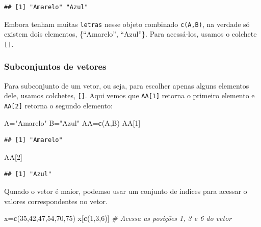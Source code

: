 \documentclass[
]{book}
\newenvironment{Shaded}{\begin{snugshade}}{\end{snugshade}}
\newcommand{\CommentTok}[1]{\textcolor[rgb]{0.56,0.35,0.01}{\textit{#1}}}
\newcommand{\DecValTok}[1]{\textcolor[rgb]{0.00,0.00,0.81}{#1}}
\newcommand{\KeywordTok}[1]{\textcolor[rgb]{0.13,0.29,0.53}{\textbf{#1}}}
\newcommand{\NormalTok}[1]{#1}
\newcommand{\StringTok}[1]{\textcolor[rgb]{0.31,0.60,0.02}{#1}}
\theoremstyle{definition}
\theoremstyle{definition}
\theoremstyle{definition}
\theoremstyle{remark}
\begin{document}
\begin{verbatim}
## [1] "Amarelo" "Azul"
\end{verbatim}

Embora tenham muitas \texttt{letras} nesse objeto combinado \texttt{c(A,B)}, na verdade só existem dois elementos, \{``Amarelo'', ``Azul''\}. Para acessá-los, usamos o colchete \texttt{{[}{]}}.

\hypertarget{subconjuntos-de-vetores}{%
\subsubsection{Subconjuntos de vetores}\label{subconjuntos-de-vetores}}

Para subconjunto de um vetor, ou seja, para escolher apenas alguns elementos dele, usamos colchetes, \texttt{{[}{]}}. Aqui vemos que \texttt{AA{[}1{]}} retorna o primeiro elemento e \texttt{AA{[}2{]}} retorna o segundo elemento:

\begin{Shaded}
\begin{Highlighting}[]
\NormalTok{A=}\StringTok{"Amarelo"}
\NormalTok{B=}\StringTok{"Azul"}
\NormalTok{AA=}\KeywordTok{c}\NormalTok{(A,B)}
\NormalTok{AA[}\DecValTok{1}\NormalTok{]}
\end{Highlighting}
\end{Shaded}

\begin{verbatim}
## [1] "Amarelo"
\end{verbatim}

\begin{Shaded}
\begin{Highlighting}[]
\NormalTok{AA[}\DecValTok{2}\NormalTok{]}
\end{Highlighting}
\end{Shaded}

\begin{verbatim}
## [1] "Azul"
\end{verbatim}

Qunado o vetor é maior, podemso usar um conjunto de indices para acessar o valores correspondentes no vetor.

\begin{Shaded}
\begin{Highlighting}[]
\NormalTok{x=}\KeywordTok{c}\NormalTok{(}\DecValTok{35}\NormalTok{,}\DecValTok{42}\NormalTok{,}\DecValTok{47}\NormalTok{,}\DecValTok{54}\NormalTok{,}\DecValTok{70}\NormalTok{,}\DecValTok{75}\NormalTok{)}
\NormalTok{x[}\KeywordTok{c}\NormalTok{(}\DecValTok{1}\NormalTok{,}\DecValTok{3}\NormalTok{,}\DecValTok{6}\NormalTok{)]     }\CommentTok{# Acessa as posições 1, 3 e 6 do vetor}
\end{Highlighting}
\end{Shaded}
\end{document}
